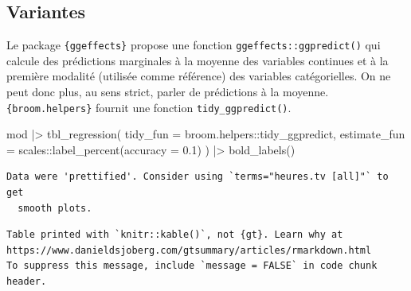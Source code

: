 \documentclass[
  letterpaper,
  DIV=11,
  numbers=noendperiod,
  oneside]{scrreprt}
\newenvironment{Shaded}{\begin{snugshade}}{\end{snugshade}}
\newcommand{\AttributeTok}[1]{\textcolor[rgb]{0.40,0.45,0.13}{#1}}
\newcommand{\FloatTok}[1]{\textcolor[rgb]{0.68,0.00,0.00}{#1}}
\newcommand{\FunctionTok}[1]{\textcolor[rgb]{0.28,0.35,0.67}{#1}}
\newcommand{\NormalTok}[1]{\textcolor[rgb]{0.00,0.23,0.31}{#1}}
\newcommand{\SpecialCharTok}[1]{\textcolor[rgb]{0.37,0.37,0.37}{#1}}
\begin{document}
\hypertarget{variantes}{%
\subsection{Variantes}\label{variantes}}

Le package \texttt{\{ggeffects\}} propose une fonction
\texttt{ggeffects::ggpredict()} qui calcule des prédictions marginales à
la moyenne des variables continues et à la première modalité (utilisée
comme référence) des variables catégorielles. On ne peut donc plus, au
sens strict, parler de prédictions à la moyenne.
\texttt{\{broom.helpers\}} fournit une fonction
\texttt{tidy\_ggpredict()}.

\begin{Shaded}
\begin{Highlighting}[]
\NormalTok{mod }\SpecialCharTok{|\textgreater{}} 
  \FunctionTok{tbl\_regression}\NormalTok{(}
    \AttributeTok{tidy\_fun =}\NormalTok{ broom.helpers}\SpecialCharTok{::}\NormalTok{tidy\_ggpredict,}
    \AttributeTok{estimate\_fun =}\NormalTok{ scales}\SpecialCharTok{::}\FunctionTok{label\_percent}\NormalTok{(}\AttributeTok{accuracy =} \FloatTok{0.1}\NormalTok{)}
\NormalTok{  ) }\SpecialCharTok{|\textgreater{}} 
  \FunctionTok{bold\_labels}\NormalTok{()}
\end{Highlighting}
\end{Shaded}

\begin{verbatim}
Data were 'prettified'. Consider using `terms="heures.tv [all]"` to get
  smooth plots.
\end{verbatim}

\begin{verbatim}
Table printed with `knitr::kable()`, not {gt}. Learn why at
https://www.danieldsjoberg.com/gtsummary/articles/rmarkdown.html
To suppress this message, include `message = FALSE` in code chunk header.
\end{verbatim}
\end{document}
